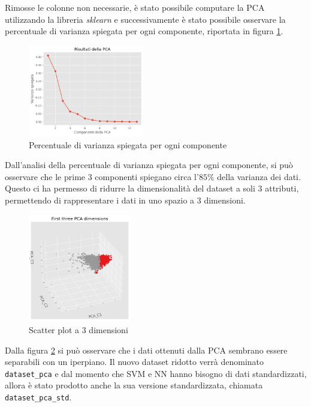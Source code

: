 Rimosse le colonne non necessarie, è stato possibile computare la PCA utilizzando
la libreria \textit{sklearn} e successivamente è stato possibile osservare la
percentuale di varianza spiegata per ogni componente, riportata in figura \ref{fig:pca}.
\begin{figure}[!ht]
      \centering
      \includegraphics[width=0.45\textwidth]{img/analisi/pcaVarianza.png}
      \caption{Percentuale di varianza spiegata per ogni componente}
      \label{fig:pca}
\end{figure}

Dall'analisi della percentuale di varianza spiegata per ogni componente, si può
osservare che le prime $3$ componenti spiegano circa l'$85\%$ della varianza
dei dati. Questo ci ha permesso di ridurre la dimensionalità del dataset a soli
$3$ attributi, permettendo di rappresentare i dati in uno spazio a $3$ dimensioni.
\begin{figure}[!ht]
      \centering
      \includegraphics[width=0.4\textwidth]{img/analisi/pcaNuovoDataset.png}
      \caption{Scatter plot a 3 dimensioni}
      \label{fig:pca-3d}
\end{figure}

Dalla figura \ref{fig:pca-3d} si può osservare che i dati ottenuti dalla PCA
sembrano essere separabili con un iperpiano. Il nuovo dataset ridotto verrà
denominato \texttt{dataset\_pca} e dal momento che SVM e NN hanno bisogno di dati
standardizzati, allora è stato prodotto anche la sua versione standardizzata,
chiamata \texttt{dataset\_pca\_std}.

